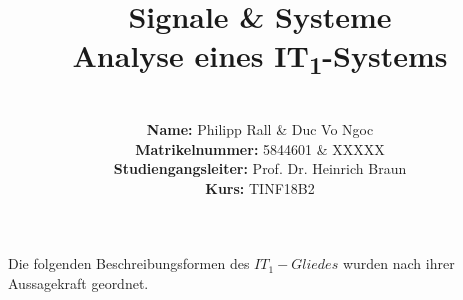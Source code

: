 \documentclass{article}
\title{\textbf{Signale \& Systeme \\ Analyse eines IT\textsubscript{1}-Systems}}
\author{
\vspace{8em} \\
\textbf{Name:} Philipp Rall \& Duc Vo Ngoc \\
\textbf{Matrikelnummer:} 5844601 \& XXXXX \\
\textbf{Studiengangsleiter:} Prof. Dr. Heinrich Braun\\
\textbf{Kurs:} TINF18B2 \\
\vspace{8em} 
}
\begin{document}
\maketitle
\newpage
\noindent
Die folgenden Beschreibungsformen des $IT_1-Gliedes$ wurden nach ihrer Aussagekraft geordnet.










\end{document}
